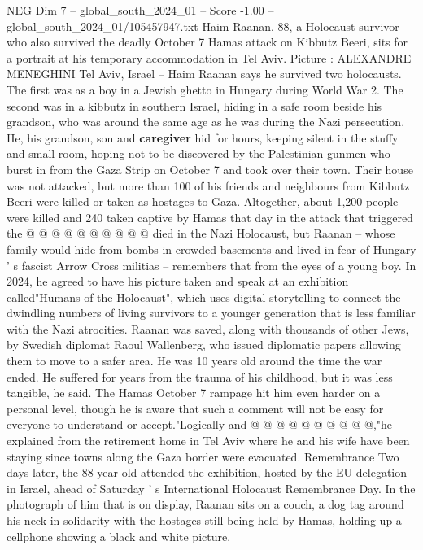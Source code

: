 \begin{textsample}{NEG Dim 7 – global\_south\_2024\_01 – Score -1.00 – global\_south\_2024\_01/105457947.txt}  \label{ex:f7_neg_144}
Haim Raanan, 88, a Holocaust survivor who also survived the deadly October 7 Hamas attack on Kibbutz Beeri, sits for a portrait at his temporary accommodation in Tel Aviv.
Picture : ALEXANDRE MENEGHINI Tel Aviv, Israel -- Haim Raanan says he survived two holocausts.
The first was as a boy in a Jewish ghetto in Hungary during World War 2.
The second was in a kibbutz in southern Israel, hiding in a safe room beside his grandson, who was around the same age as he was during the Nazi persecution.
He, his grandson, son and \textbf{caregiver} hid for hours, keeping silent in the stuffy and small room, hoping not to be discovered by the Palestinian gunmen who burst in from the Gaza Strip on October 7 and took over their town.
Their house was not attacked, but more than 100 of his friends and neighbours from Kibbutz Beeri were killed or taken as hostages to Gaza.
Altogether, about 1,200 people were killed and 240 taken captive by Hamas that day in the attack that triggered the @ @ @ @ @ @ @ @ @ @ died in the Nazi Holocaust, but Raanan -- whose family would hide from bombs in crowded basements and lived in fear of Hungary ' s fascist Arrow Cross militias -- remembers that from the eyes of a young boy.
In 2024, he agreed to have his picture taken and speak at an exhibition called"Humans of the Holocaust", which uses digital storytelling to connect the dwindling numbers of living survivors to a younger generation that is less familiar with the Nazi atrocities.
Raanan was saved, along with thousands of other Jews, by Swedish diplomat Raoul Wallenberg, who issued diplomatic papers allowing them to move to a safer area.
He was 10 years old around the time the war ended.
He suffered for years from the trauma of his childhood, but it was less tangible, he said.
The Hamas October 7 rampage hit him even harder on a personal level, though he is aware that such a comment will not be easy for everyone to understand or accept."Logically and @ @ @ @ @ @ @ @ @ @,"he explained from the retirement home in Tel Aviv where he and his wife have been staying since towns along the Gaza border were evacuated.
Remembrance Two days later, the 88-year-old attended the exhibition, hosted by the EU delegation in Israel, ahead of Saturday ' s International Holocaust Remembrance Day.
In the photograph of him that is on display, Raanan sits on a couch, a dog tag around his neck in solidarity with the hostages still being held by Hamas, holding up a cellphone showing a black and white picture.

\end{textsample}

